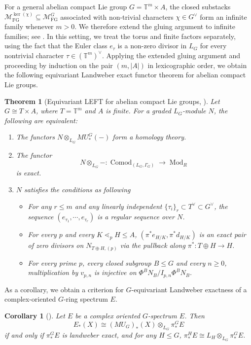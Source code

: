 \documentclass[11pt,reqno]{amsart}
\newtheorem{theorem}{Theorem}[section]
\newtheorem{corollary}[corollary]{Corollary}
\newcommand{\MFG}{\mathcal M_{\mathrm{FG}}}
\newcommand{\bbT}{\mathbb T}
\newcommand{\tensor}{\otimes}
\begin{document}
For a general abelian compact Lie group $G=\bbT^m\times A$, the closed substacks $\MFG^{\ker(\chi)}\subseteq\MFG^G$ associated with non-trivial characters $\chi\in G^\vee$ form an infinite family whenever $m>0$. We therefore extend the gluing argument to infinite families; see . In this setting, we treat the torus and finite factors separately, using the fact that the Euler class $e_\tau$ is a non-zero divisor in $L_G$ for every nontrivial character $\tau\in(\bbT^m)^\vee$. Applying the extended gluing argument and proceeding by induction on the pair $(m,|A|)$ in lexicographic order, we obtain the following equivariant Landweber exact functor theorem for abelian compact Lie groups.

\begin{theorem}[Equivariant LEFT for abelian compact Lie groups, ]\label{introthm:compact-LEFT}
Let $G\cong T\times A$, where $T=\bbT^m$ and $A$ is finite. For a graded $L_G$-module $N$, the following are equivalent:
\begin{enumerate}[label=\textup{(\roman*)},leftmargin=3em]
\item The functors $ N\tensor_{L_{G}} MU_*^G(-) $ form a homology theory.
\item The functor
\[
N\otimes_{L_G}- \colon \operatorname{Comod}_{(L_G,\Gamma_G)} \longrightarrow\operatorname{Mod}_R
\]
is exact.
\item $N$ satisfies the conditions as following
\begin{itemize}[leftmargin=3em]
  \item[$(\mathrm{RE})$] For any $r\leq m$ and any linearly independent $\{\tau_i\}_r \subset T^\vee \subset G^\vee$, the sequence $(e_{\tau_1},\cdots, e_{\tau_r})$ is a regular sequence over $N$.
  \item[$(\mathrm{EU})$] For every $p$ and every $K\lessdot_p H\leq A$, $(\pi^* e_{H/K},\pi^* d_{H/K})$ is an exact pair of zero divisors on $N_{T\oplus H,(p)}$ via the pullback along $\pi^*\colon T\oplus H \to H$.
  \item[$\mathrm{(LE)}$] For every prime $p$, every closed subgroup $B\leq G$ and every $n\geq0$, multiplication by $v_{p,n}$ is injective on $\Phi^B N_B/I_{p,n}\Phi^B N_B$.
\end{itemize}
\end{enumerate}
\end{theorem}

As a corollary, we obtain a criterion for $G$-equivariant Landweber exactness of a complex-oriented $G$-ring spectrum $E$.
\begin{corollary}[]\label{introcor:spectra level representation}
  Let $E$ be a complex oriented $G$-spectrum $E$. Then 
  \[
  E_*(X) \cong (MU_G)_*(X)\otimes_{L_G} \pi_*^G E
  \]
  if and only if $\pi_*^G E$ is landweber exact, and for any $H\leq G$, $\pi_*^H E \cong L_H\otimes_{L_G} \pi_*^G E$.
\end{corollary}
\end{document}
